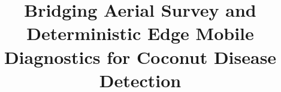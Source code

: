 \documentclass[conference,a4paper]{IEEEtran}
\begin{document}
\title{Bridging Aerial Survey and Deterministic Edge Mobile Diagnostics for Coconut Disease Detection}

\author{
}


\maketitle
\flushbottom
\end{document}
